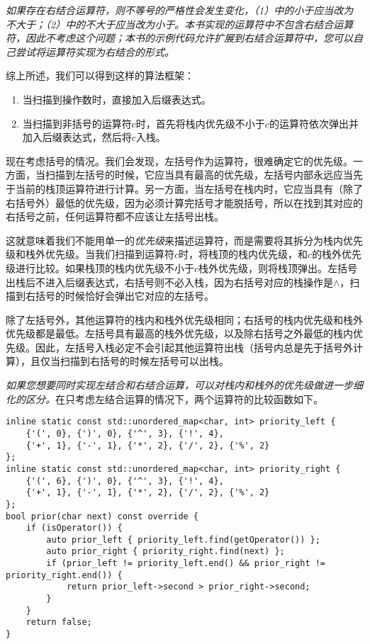 \textit{如果存在右结合运算符，则不等号的严格性会发生变化，（1）中的\textit{小于}应当改为\textit{不大于}；（2）中的\textit{不大于}应当改为\textit{小于}。本书实现的运算符中不包含右结合运算符，因此不考虑这个问题；本书的示例代码允许扩展到右结合运算符中，您可以自己尝试将运算符实现为右结合的形式。}

综上所述，我们可以得到这样的算法框架：
\begin{enumerate}
    \item 当扫描到操作数时，直接加入后缀表达式。
    \item 当扫描到非括号的运算符$c$时，首先将栈内优先级不小于$c$的运算符依次弹出并加入后缀表达式，然后将$c$入栈。
\end{enumerate}

现在考虑括号的情况。我们会发现，左括号作为运算符，很难确定它的优先级。一方面，当扫描到左括号的时候，它应当具有最高的优先级，左括号内部永远应当先于当前的栈顶运算符进行计算。另一方面，当左括号在栈内时，它应当具有（除了右括号外）最低的优先级，因为必须计算完括号才能脱括号，所以在找到其对应的右括号之前，任何运算符都不应该让左括号出栈。

这就意味着我们不能用单一的\textit{优先级}来描述运算符，而是需要将其拆分为栈内优先级和栈外优先级。当我们扫描到运算符$c$时，将栈顶的栈内优先级，和$c$的栈外优先级进行比较。如果栈顶的栈内优先级不小于$c$栈外优先级，则将栈顶弹出。左括号出栈后不进入后缀表达式，右括号则不必入栈，因为右括号对应的栈操作是$\land$，扫描到右括号的时候恰好会弹出它对应的左括号。

除了左括号外，其他运算符的栈内和栈外优先级相同；右括号的栈内优先级和栈外优先级都是最低。左括号具有最高的栈外优先级，以及除右括号之外最低的栈内优先级。因此，左括号入栈必定不会引起其他运算符出栈（括号内总是先于括号外计算），且仅当扫描到右括号的时候左括号可以出栈。

\textit{如果您想要同时实现左结合和右结合运算，可以对栈内和栈外的优先级做进一步细化的区分。}在只考虑左结合运算的情况下，两个运算符的比较函数如下。

\begin{lstlisting}
inline static const std::unordered_map<char, int> priority_left {
    {'(', 0}, {')', 0}, {'^', 3}, {'!', 4},
    {'+', 1}, {'-', 1}, {'*', 2}, {'/', 2}, {'%', 2}
};
inline static const std::unordered_map<char, int> priority_right {
    {'(', 6}, {')', 0}, {'^', 3}, {'!', 4},
    {'+', 1}, {'-', 1}, {'*', 2}, {'/', 2}, {'%', 2}
};
bool prior(char next) const override {
    if (isOperator()) {
        auto prior_left { priority_left.find(getOperator()) };
        auto prior_right { priority_right.find(next) };
        if (prior_left != priority_left.end() && prior_right != priority_right.end()) {
            return prior_left->second > prior_right->second;
        }
    }
    return false;
}
\end{lstlisting}

